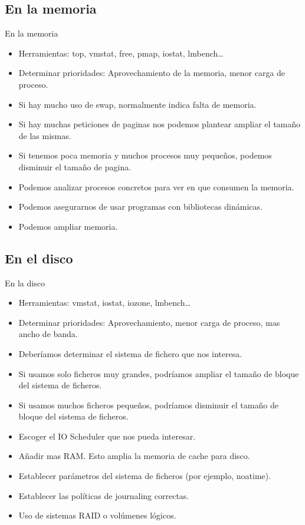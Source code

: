 \subsection{En la memoria}
\begin{frame}{En la memoria}
	\begin{itemize}
		\item Herramientas: top, vmstat, free, pmap, iostat, lmbench\dots
		\item Determinar prioridades: Aprovechamiento de la memoria, menor carga de proceso.
		\item Si hay mucho uso de swap, normalmente indica falta de memoria.
		\item Si hay muchas peticiones de paginas nos podemos plantear ampliar el tamaño de las mismas.
		\item Si tenemos poca memoria y muchos procesos muy pequeños, podemos disminuir el tamaño de pagina. 
		\item Podemos analizar procesos concretos para ver en que consumen la memoria.
		\item Podemos asegurarnos de usar programas con bibliotecas dinámicas.
		\item Podemos ampliar memoria.
	\end{itemize}
\end{frame}

\subsection{En el disco}
\begin{frame}{En la disco}
	\begin{itemize}
		\item Herramientas: vmstat, iostat, iozone, lmbench\dots
		\item Determinar prioridades: Aprovechamiento, menor carga de proceso, mas ancho de banda.
		\item Deberíamos determinar el sistema de fichero que nos interesa.
		\item Si usamos solo ficheros muy grandes, podríamos ampliar el tamaño de bloque del sistema de ficheros.
		\item Si usamos muchos ficheros pequeños, podríamos disminuir el tamaño de bloque del sistema de ficheros.
		\item Escoger el IO Scheduler que nos pueda interesar.
		\item Añadir mas RAM. Esto amplia la memoria de cache para disco.
		\item Establecer parámetros del sistema de ficheros (por ejemplo, noatime).
		\item Establecer las políticas de journaling correctas.
		\item Uso de sistemas RAID o volúmenes lógicos.
	\end{itemize}
\end{frame}

